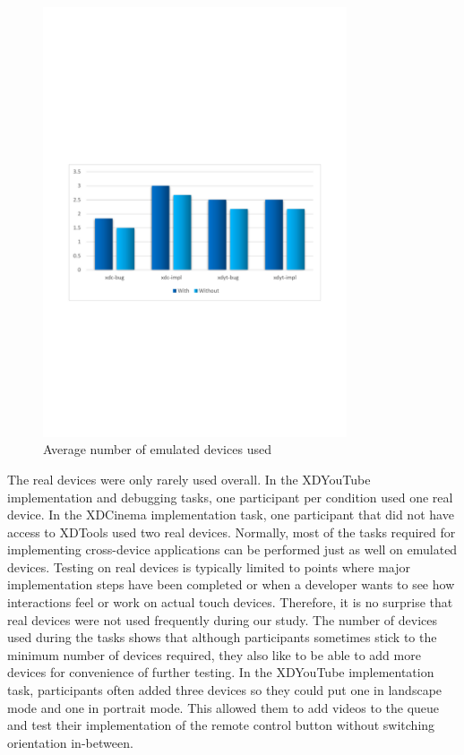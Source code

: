 \begin{figure}[H]
  \centering
    \includegraphics[width=0.8\textwidth]{images/charts/n_emulated.pdf}
	\caption[Emulated device used]{Average number of emulated devices used}
	\label{fig:n_emulated}
\end{figure}

The real devices were only rarely used overall. In the XDYouTube implementation and debugging tasks, one participant per condition used one real device. In the XDCinema implementation task, one participant that did not have access to XDTools used two real devices. Normally, most of the tasks required for implementing cross-device applications can be performed just as well on emulated devices. Testing on real devices is typically limited to points where major implementation steps have been completed or when a developer wants to see how interactions feel or work on actual touch devices. Therefore, it is no surprise that real devices were not used frequently during our study. The number of devices used during the tasks shows that although participants sometimes stick to the minimum number of devices required, they also like to be able to add more devices for convenience of further testing. In the XDYouTube implementation task, participants often added three devices so they could put one in landscape mode and one in portrait mode. This allowed them to add videos to the queue and test their implementation of the remote control button without switching orientation in-between. 

